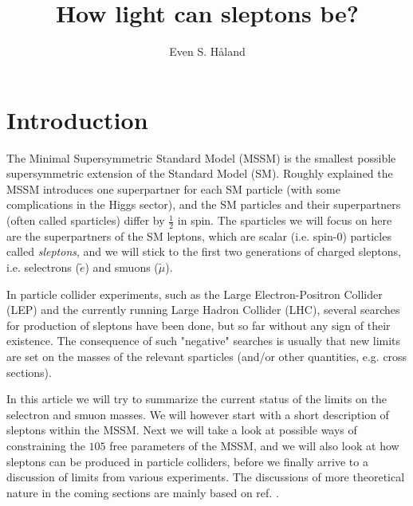 \documentclass[twocolumn,a4paper,10pt]{article}
\author{Even S. Håland}
\title{How light can sleptons be?}
\begin{document}

\section{Introduction}

The Minimal Supersymmetric Standard Model (MSSM) is the smallest possible supersymmetric extension 
of the Standard Model (SM). Roughly explained the MSSM introduces one superpartner for each 
SM particle (with some complications in the Higgs sector), and the SM particles and their 
superpartners (often called sparticles) differ by $\frac{1}{2}$ in spin. 
The sparticles we will focus on here are the superpartners of the SM leptons, which are scalar (i.e. 
spin-$0$) particles called \textit{sleptons}, and we will stick to the first two generations of 
charged sleptons, i.e. selectrons ($\tilde{e}$) and smuons ($\tilde{\mu}$).  

In particle collider experiments, such as the Large Electron-Positron Collider (LEP) and the currently 
running Large Hadron Collider (LHC), several searches for production of sleptons have been done, but 
so far without any sign of their existence. The consequence of such "negative" searches is usually 
that new limits are set on the masses of the relevant sparticles (and/or other quantities, e.g. 
cross sections).              

In this article we will try to summarize the current status of the limits on the selectron and smuon 
masses. We will however start with a short description of sleptons within the MSSM. Next we will take 
a look at possible ways of constraining the $105$ free parameters of the MSSM, and we will also look at 
how sleptons can be produced in particle colliders, before we finally arrive to a discussion of limits 
from various experiments. The discussions of more theoretical nature in the coming sections are mainly 
based on ref. \cite{Lecture notes}.             
\end{document}
